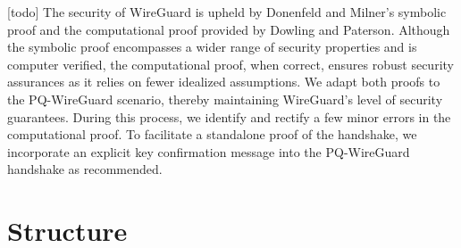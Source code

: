 [todo]
The security of WireGuard is upheld by Donenfeld and Milner's symbolic proof and the computational proof provided by Dowling and Paterson. Although the symbolic proof encompasses a wider range of security properties and is computer verified, the computational proof, when correct, ensures robust security assurances as it relies on fewer idealized assumptions. We adapt both proofs to the PQ-WireGuard scenario, thereby maintaining WireGuard's level of security guarantees. During this process, we identify and rectify a few minor errors in the computational proof. To facilitate a standalone proof of the handshake, we incorporate an explicit key confirmation message into the PQ-WireGuard handshake as recommended.

\section{Structure}
